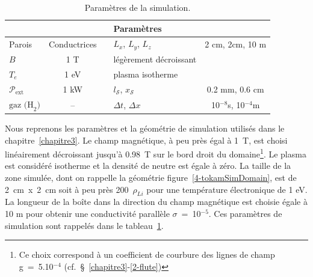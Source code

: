 \begin{refsection}
\begin{table}[!htbp]
\footnotesize\centering
{}
\begin{tabular}{lcclc}\toprule
\multicolumn{5}{c}{\bf Paramètres}\\
\midrule 
Parois & Conductrices&&$L_x$, $L_y$, $L_z$  & 2 cm, 2cm, 10 m\\
$B$&1 T&& légèrement décroissant&\\
$T_e$&1 eV&& plasma isotherme& \\
$\mathcal{P}_\text{ext}$&1 kW&&$l_\mathcal{S}$, $x_\mathcal{S}$& 0.2 mm, 0.6
cm\\
$\text{gaz (H}_2\text{)}$ & -- &&$\Delta t$, $\Delta x$&10$^{-8}$s, 10$^{-4}$m\\
\bottomrule
\end{tabular}
\caption{Paramètres de la simulation.}\label{4-CybeleParam3}
\end{table}

Nous reprenons les paramètres et la géométrie de simulation utilisés dans le
chapitre~\ref{chapitre3}. Le champ magnétique, à peu près égal à 1~T, est
choisi linéairement décroissant jusqu'à 0.98~T sur le bord droit du
domaine\footnote{Ce choix correspond à un coefficient de courbure des lignes de
champ g~=~5.10$^{-4}$ (cf.~\S~\ref{chapitre3}-\ref{2-flute})}.
Le plasma est considéré isotherme et la densité de neutre est égale à zéro. La
taille de la zone simulée, dont on rappelle la géométrie
figure~\ref{4-tokamSimDomain}, est de 2~cm~x~2~cm soit à peu près
200~$\rho_{Li}$ pour une température électronique de 1 eV. La longueur de la boîte dans la direction du champ magnétique est choisie égale à 10 m pour obtenir une
conductivité parallèle $\sigma$~=~10$^{-5}$. Ces paramètres de simulation sont
rappelés dans le tableau~\ref{4-CybeleParam3}.


\end{refsection}
